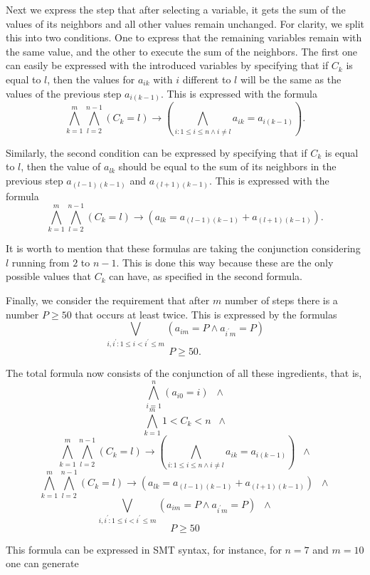 Next we express the step that after selecting a variable, it gets the sum of the values of its neighbors and all other values remain unchanged. For clarity, we split this into two conditions. One to express that the remaining variables remain with the same value, and the other to execute the sum of the neighbors. The first one can easily be expressed with the introduced variables by specifying that if $C_k$ is equal to $l$, then the values for $a_{ik}$ with $i$ different to $l$ will be the same as the values of the previous step $a_{i(k-1)}$. This is expressed with the formula
\[ \bigwedge_{k=1}^{m} \bigwedge_{l=2}^{n-1}(C_k = l) \rightarrow (\bigwedge_{i: 1 \leq i \leq n \wedge i \neq l} a_{ik} = a_{i(k-1)}).\]

Similarly, the second condition can be expressed by specifying that if $C_k$ is equal to $l$, then the value of $a_{lk}$ should be equal to the sum of its neighbors in the previous step $a_{(l-1)(k-1)}$ and $a_{(l+1)(k-1)}$. This is expressed with the formula
\[ \bigwedge_{k=1}^{m} \bigwedge_{l=2}^{n-1}(C_k = l) \rightarrow (a_{lk} = a_{(l-1)(k-1)} + a_{(l+1)(k-1)}).\]

It is worth to mention that these formulas are taking the conjunction considering $l$ running from $2$ to $n-1$. This is done this way because these are the only possible values that $C_k$ can have, as specified in the second formula.

Finally, we consider the requirement that after $m$ number of steps there is a number $P \geq 50$ that occurs at least twice. This is expressed by the formulas
\[ \bigvee_{i,i^{\prime}: 1\leq i < i^{\prime} \leq m} (a_{im} = P \wedge a_{i^{\prime} m} = P)\]
\[ P \geq 50.\]

The total formula now consists of the conjunction of all these
ingredients, that is,
\[ \bigwedge_{i=1}^n (a_{i0} = i) \;\;\wedge\]
\[ \bigwedge_{k=1}^m 1<C_k<n \;\;\wedge\]
\[ \bigwedge_{k=1}^{m} \bigwedge_{l=2}^{n-1}(C_k = l) \rightarrow (\bigwedge_{i: 1 \leq i \leq n \wedge i \neq l} a_{ik} = a_{i(k-1)}) \;\;\wedge\]
\[ \bigwedge_{k=1}^{m} \bigwedge_{l=2}^{n-1}(C_k = l) \rightarrow (a_{lk} = a_{(l-1)(k-1)} + a_{(l+1)(k-1)}) \;\;\wedge\]
\[ \bigvee_{i,i^{\prime}: 1\leq i < i^{\prime} \leq m} (a_{im} = P \wedge a_{i^{\prime} m} = P) \;\;\wedge\]
\[ P \geq 50\]

This formula can be expressed in SMT syntax, for instance, for $n=7$ and $m=10$ one can generate

